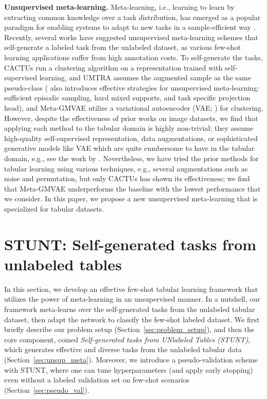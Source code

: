 \textbf{Unsupervised meta-learning.} Meta-learning, i.e., learning to learn by extracting common knowledge over a task distribution, has emerged as a popular paradigm for enabling systems to adapt to new tasks in a sample-efficient way \citep{vinyals2016matching,finn2017maml,snell2017proto}. Recently, several works have suggested unsupervised meta-learning schemes that self-generate a labeled task from the unlabeled dataset, as various few-shot learning applications suffer from high annotation costs. To self-generate the tasks, CACTUs \citep{hsu2018cactus} run a clustering algorithm on a representation trained with self-supervised learning, {\color{blue}\citet{ye2022revisiting}} and UMTRA \citep{khodadadeh2019umtra} assumes the augmented sample as the same pseudo-class
(\citet{ye2022revisiting} also introduces effective strategies for unsupervised meta-learning: sufficient episodic sampling, hard mixed supports, and task specific projection head), and Meta-GMVAE \citep{lee2021metagmvae} utilize a variational autoencoder (VAE; \cite{kingma2014auto}) for clustering. However, despite the effectiveness of prior works on image datasets, we find that applying each method to the tabular domain is highly non-trivial; they assume high-quality self-supervised representation, data augmentations, or sophisticated generative models like VAE which are quite cumbersome to have in the tabular domain, e.g., see the work by \cite{xu2019modeling}. Nevertheless, we have tried the prior methods for tabular learning using various techniques, e.g., several augmentations such as noise and permutation, but only CACTUs has shown its effectiveness; we find that Meta-GMVAE underperforms the baseline with the lowest performance that we consider. In this paper, we propose a new unsupervised meta-learning that is specialized for tabular datasets.

\section{STUNT: Self-generated tasks from unlabeled tables}
\label{sec:method}

In this section, we develop an effective few-shot tabular learning framework that utilizes the power of meta-learning in an unsupervised manner. In a nutshell, our framework meta-learns over the self-generated tasks from the unlabeled tabular dataset, then adapt the network to classify the few-shot labeled dataset. We first briefly describe our problem setup (Section~\ref{sec:problem_setup}), and then the core component, coined \emph{Self-generated tasks from UNlabeled Tables (STUNT)}, which generates effective and diverse tasks from the unlabeled tabular data (Section~\ref{sec:unsup_meta}). Moreover, we introduce a pseudo-validation scheme with STUNT, where one can tune hyperparameters (and apply early stopping) even without a labeled validation set on few-shot scenarios (Section~\ref{sec:pseudo_val}).

